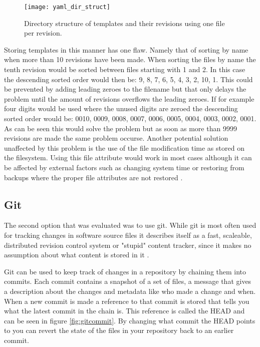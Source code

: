 \begin{figure}[h!]
	\centering
	\texttt{[image: yaml\_dir\_struct]}
	\caption{Directory structure of templates and their revisions using one file per revision.}
	\label{fig:diskstruct}
\end{figure}

Storing templates in this manner has one flaw.
Namely that of sorting by name when more than 10 revisions have been made.
When sorting the files by name the tenth revision would be sorted between files starting with 1 and 2.
In this case the descending sorted order would then be: 9, 8, 7, 6, 5, 4, 3, 2, 10, 1.
This could be prevented by adding leading zeroes to the filename but that only delays the problem until the amount of revisions overflows the leading zeroes.
If for example four digits would be used where the unused digits are zeroed the descending sorted order would be: 0010, 0009, 0008, 0007, 0006, 0005, 0004, 0003, 0002, 0001.
As can be seen this would solve the problem but as soon as more than 9999 revisions are made the same problem occurse.
Another potential solution unaffected by this problem is the use of the file modification time as stored on the filesystem.
Using this file attribute would work in most cases although it can be affected by external factors such as changing system time or restoring from backups where the proper file attributes are not restored \cite{noauthor_mtime_nodate}.

\subsection{Git}
The second option that was evaluated was to use git.
While git is most often used for tracking changes in software source files it describes itself as a fast, scaleable, distributed revision control system or "stupid" content tracker, since it makes no assumption about what content is stored in it \cite{truyers_git_2016}.

Git can be used to keep track of changes in a repository by chaining them into commits.
Each commit contains a snapshot of a set of files, a message that gives a description about the changes and metadata like who made a change and when.
When a new commit is made a reference to that commit is stored that tells you what the latest commit in the chain is.
This reference is called the HEAD and can be seen in figure \ref{fig:gitcommit}.
By changing what commit the HEAD points to you can revert the state of the files in your repository back to an earlier commit.

